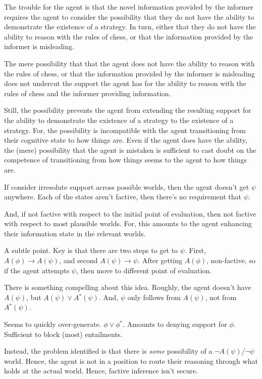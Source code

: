 \documentclass[10pt]{article}
\newcommand{\hozline}[0]{%
  \noindent\hdashrule[0.5ex][c]{\textwidth}{.1pt}{}
}
\newcommand{\nf}[1]{#1\ensuremath{^{{*}}}}
\begin{document}
\begin{note}
  The trouble for the agent is that the novel information provided by the informer requires the agent to consider the possibility that they do not have the ability to demonstrate the existence of a strategy.
  In turn, either that they do not have the ability to reason with the rules of chess, or that the information provided by the informer is misleading.

  The mere possibility that that the agent does not have the ability to reason with the rules of chess, or that the information provided by the informer is misleading does not undercut the support the agent has for the ability to reason with the rules of chess and the informer providing information.

  Still, the possibility prevents the agent from extending the resulting support for the ability to demonstrate the existence of a strategy to the existence of a strategy.
  For, the possibility is incompatible with the agent transitioning from their cognitive state to how things are.
  Even if the agent does have the ability, the (mere) possibility that the agent is mistaken is sufficient to cast doubt on the competence of transitioning from how things seems to the agent to how things are.
\end{note}


\hozline

\newpage

\begin{note}
  If consider irresolute support across possible worlds, then the agent doesn't get \(\psi\) anywhere.
  Each of the states aren't factive, then there's no requirement that \(\psi\).

  And, if not factive with respect to the initial point of evaluation, then not factive with respect to most plausible worlds.
  For, this amounts to the agent enhancing their information state in the relevant worlds.

  A subtle point.
  Key is that there are two steps to get to \(\psi\).
  First, \(A(\phi) \rightarrow A(\psi)\), and second \(A(\psi) \rightarrow \psi\).
  After getting \(A(\phi)\), non-factive, so if the agent attempts \(\psi\), then move to different point of evaluation.

  There is something compelling about this idea.
  Roughly, the agent doesn't have \(A(\psi)\), but \(A(\psi) \lor \nf{A}(\psi)\).
  And, \(\psi\) only follows from \(A(\psi)\), not from \(\nf{A}(\psi)\).

  Seems to quickly over-generate.
  \(\phi \lor \nf{\phi}\).
  Amounts to denying support for \(\phi\).
  Sufficient to block (most) entailments.

  Instead, the problem identified is that there is \emph{some} possibility of a \(\lnot A(\psi)\)/\(\lnot\psi\) world.
  Hence, the agent is not in a position to route their reasoning through what holds at the actual world.
  Hence, factive inference isn't secure.
\end{note}
\end{document}
